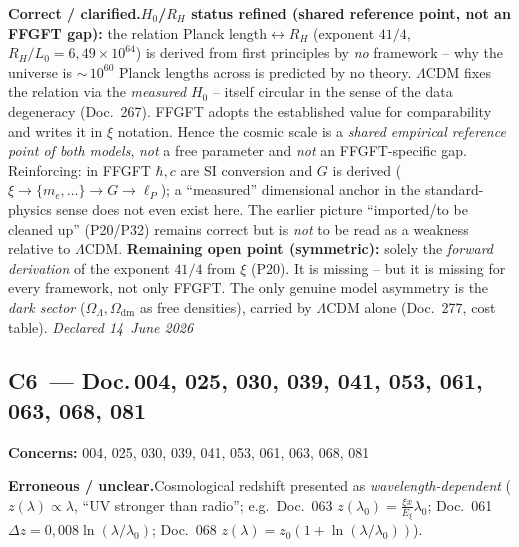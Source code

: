 \smallskip\noindent\textbf{Correct / clarified.}\quad \textbf{$H_0$/$R_H$ status refined (shared reference point, not an FFGFT gap):} the relation Planck length$\leftrightarrow R_H$ (exponent $41/4$, $R_H/L_0 = 6{,}49\times10^{64}$) is derived from first principles by \emph{no} framework -- why the universe is $\sim$\,$10^{60}$ Planck lengths across is predicted by no theory.
  \newline
  $\Lambda$CDM fixes the relation via the \emph{measured} $H_0$ -- itself circular in the sense of the data degeneracy (Doc.~267). FFGFT adopts the established value for comparability and writes it in $\xi$ notation. Hence the cosmic scale is a \emph{shared empirical reference point of both models}, \emph{not} a free parameter and \emph{not} an FFGFT-specific gap.
  \newline
  Reinforcing: in FFGFT $\hbar, c$ are SI conversion and $G$ is derived ($\xi\to\{m_e,\ldots\}\to G\to\ell_P$); a \enquote{measured} dimensional anchor in the standard-physics sense does not even exist here. The earlier picture \enquote{imported/to be cleaned up} (P20/P32) remains correct but is \emph{not} to be read as a weakness relative to $\Lambda$CDM.
  \newline
  \textbf{Remaining open point (symmetric):} solely the \emph{forward derivation} of the exponent $41/4$ from $\xi$ (P20). It is missing -- but it is missing for every framework, not only FFGFT. The only genuine model asymmetry is the \emph{dark sector} ($\Omega_\Lambda, \Omega_\text{dm}$ as free densities), carried by $\Lambda$CDM alone (Doc.~277, cost table). \emph{Declared 14~June 2026}


\medskip


\subsection*{C6~--- Doc.\,004, 025, 030, 039, 041, 053, 061, 063, 068, 081}

\noindent\textbf{Concerns:} 004, 025, 030, 039, 041, 053, 061, 063, 068, 081


\smallskip\noindent\textbf{Erroneous / unclear.}\quad Cosmological redshift presented as \emph{wavelength-dependent} ($z(\lambda)\propto\lambda$, \enquote{UV stronger than radio}; e.g.\ Doc.~063 $z(\lambda_0)=\tfrac{\xi x}{E_\xi}\lambda_0$; Doc.~061 $\Delta z=0{,}008\ln(\lambda/\lambda_0)$; Doc.~068 $z(\lambda)=z_0(1+\ln(\lambda/\lambda_0))$).


